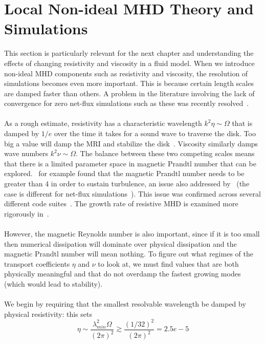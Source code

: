 
\section{Local Non-ideal MHD Theory and Simulations} \label{sec:localnonideal}
This section is particularly relevant for the next chapter and understanding the effects of changing resistivity and viscosity in a fluid model. When we introduce non-ideal MHD components such as resistivity and viscosity, the resolution of simulations becomes even more important. This is because certain length scales are damped faster than others. A problem in the literature involving the lack of convergence for zero net-flux simulations such as these was recently resolved~\cite{Fromang2007a,Shi2016}.\\
\\
As a rough estimate, resistivity has a characteristic wavelength $k^2\eta\sim\Omega$ that is damped by $1/e$ over the time it takes for a sound wave to traverse the disk. Too big a value will damp the MRI and stabilize the disk~\cite{Fleming2000}. Viscosity similarly damps wave numbers $k^2\nu\sim\Omega$. The balance between these two competing scales means that there is a limited parameter space in magnetic Prandtl number that can be explored.~\citet{Fromang2007b} for example found that the magnetic Prandtl number needs to be greater than 4 in order to sustain turbulence, an issue also addressed by~\citet{Simon2009a} (the case is different for net-flux simulations~\cite{Simon2009b}). This issue was confirmed across several different code suites~\citet{Fromang2007b}. The growth rate of resistive MHD is examined more rigorously in~\citet{BH1998}.\\
\\
However, the magnetic Reynolds number is also important, since if it is too small then numerical dissipation will dominate over physical dissipation and the magnetic Prandtl number will mean nothing. To figure out what regimes of the transport coefficients $\eta$ and $\nu$ to look at, we must find values that are both physically meaningful and that do not overdamp the fastest growing modes (which would lead to stability). \\
\\
We begin by requiring that the smallest resolvable wavelength be damped by physical resistivity: this sets
\begin{equation*}
  \eta\sim\frac{\lambda_{min}^2\Omega}{(2\pi)^2}\gtrsim\frac{(1/32)^2}{(2\pi)^2}=2.5e-5
\end{equation*}
